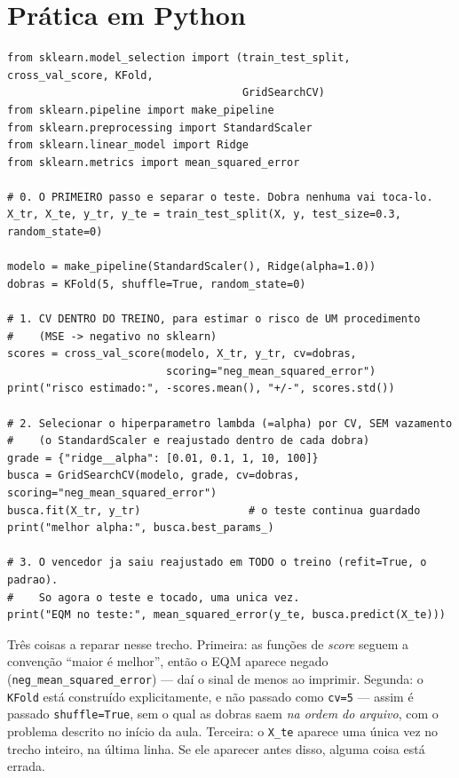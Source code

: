 \documentclass[11pt,a4paper]{article}
\begin{document}
\section{Prática em Python}
\begin{lstlisting}
from sklearn.model_selection import (train_test_split, cross_val_score, KFold,
                                     GridSearchCV)
from sklearn.pipeline import make_pipeline
from sklearn.preprocessing import StandardScaler
from sklearn.linear_model import Ridge
from sklearn.metrics import mean_squared_error

# 0. O PRIMEIRO passo e separar o teste. Dobra nenhuma vai toca-lo.
X_tr, X_te, y_tr, y_te = train_test_split(X, y, test_size=0.3, random_state=0)

modelo = make_pipeline(StandardScaler(), Ridge(alpha=1.0))
dobras = KFold(5, shuffle=True, random_state=0)

# 1. CV DENTRO DO TREINO, para estimar o risco de UM procedimento
#    (MSE -> negativo no sklearn)
scores = cross_val_score(modelo, X_tr, y_tr, cv=dobras,
                         scoring="neg_mean_squared_error")
print("risco estimado:", -scores.mean(), "+/-", scores.std())

# 2. Selecionar o hiperparametro lambda (=alpha) por CV, SEM vazamento
#    (o StandardScaler e reajustado dentro de cada dobra)
grade = {"ridge__alpha": [0.01, 0.1, 1, 10, 100]}
busca = GridSearchCV(modelo, grade, cv=dobras, scoring="neg_mean_squared_error")
busca.fit(X_tr, y_tr)                 # o teste continua guardado
print("melhor alpha:", busca.best_params_)

# 3. O vencedor ja saiu reajustado em TODO o treino (refit=True, o padrao).
#    So agora o teste e tocado, uma unica vez.
print("EQM no teste:", mean_squared_error(y_te, busca.predict(X_te)))
\end{lstlisting}

\begin{atencao}
Três coisas a reparar nesse trecho. Primeira: as funções de \emph{score} seguem a
convenção ``maior é melhor'', então o EQM aparece negado
(\texttt{neg\_mean\_squared\_error}) --- daí o sinal de menos ao imprimir. Segunda:
o \texttt{KFold} está construído explicitamente, e não passado como
\texttt{cv=5} --- assim é passado \texttt{shuffle=True}, sem o qual as dobras saem
\emph{na ordem do arquivo}, com o problema descrito no início da aula. Terceira: o
\texttt{X\_te} aparece uma única vez no trecho inteiro, na última linha. Se ele
aparecer antes disso, alguma coisa está errada.
\end{atencao}
\end{document}
